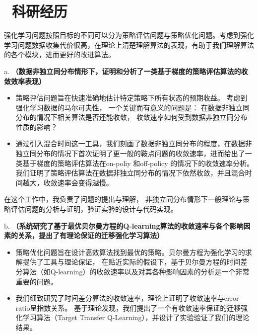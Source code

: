 \documentclass{resume}
\begin{document}
\section{\faCogs\ 科研经历}
 


强化学习问题按照目标的不同可以分为策略评估问题与策略优化问题。考虑到强化学习问题数据收集代价很高，在理论上清楚理解算法的表现，有助于我们理解算法的各个模块，进而更好的改进算法。

a. \textbf{（数据非独立同分布情形下，证明和分析了一类基于梯度的策略评估算法的收敛效率表现）}  
\begin{itemize}
  \item 策略评估问题旨在快速准确地估计特定策略下所有状态的预期收益。 考虑到强化学习数据的马尔可夫性， 一个关键而有意义的问题是： 在数据非独立同分布的情况下相关算法是否还能收敛， 收敛速率如何受到数据非独立同分布性质的影响？
  
  \item 通过引入混合时间这一工具，我们刻画了数据非独立同分布的程度，在数据非独立同分布的情况下首次证明了更一般的鞍点问题的收敛速率，进而给出了一类基于梯度的策略评估算法在on-poliy 和off-policy 的情况下的收敛速率分析。我们证明了策略评估算法在数据非独立同分布的情况下依然收敛，并且混合时间越大，收敛速率会变得越慢。
\end{itemize}


\faHandORight 在这个工作中，我负责了问题的提出与理解， 非独立同分布情形下一般理论与策略评估问题的分析与证明，验证实验的设计与代码实现。

b. \textbf{（系统研究了基于最优贝尔曼方程的Q-learning算法的收敛速率与各个影响因素的关系，提出了有理论保证的迁移强化学习算法）} 
\begin{itemize}
  \item 策略优化问题旨在设计高效算法找到最优的策略。贝尔曼方程为强化学习的求解提供了工具与理论保证， 在贴近实际的假设下，基于贝尔曼方程的时间差分算法（如Q-learning）的收敛速率以及对其各种影响因素的分析是一个非常重要的问题。
  \item 我们细致研究了时间差分算法的收敛速率，理论上证明了收敛速率与error ratio呈指数关系。 基于理论发现，我们提出了一个有收敛速率保证的迁移强化学习算法（Target Transfer Q-Learning），并设计了实验验证了我们的理论结果。
\end{itemize}
\end{document}
